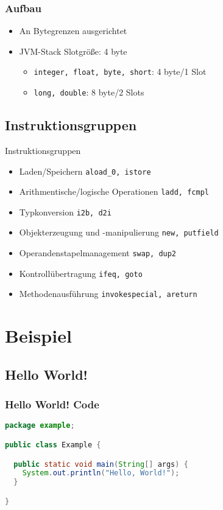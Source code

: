\documentclass[10pt]{beamer}
\begin{document}

\begin{frame}[fragile]
\frametitle{Aufbau}
\begin{itemize}
\item An Bytegrenzen ausgerichtet
\item JVM-Stack Slotgröße: 4 byte
\begin{itemize}
\item {\tt integer, float, byte, short}: 4 byte/1 Slot
\item {\tt long, double}: 8 byte/2 Slots
\end{itemize}
\end{itemize}
\end{frame}


\subsection{Instruktionsgruppen}
\begin{frame}{Instruktionsgruppen}
\begin{itemize}
\item Laden/Speichern \hfill {\tt aload\_0, istore}\;\;\;\pause
\item Arithmentische/logische Operationen \hfill {\tt ladd, fcmpl}\;\;\;\pause
\item Typkonversion \hfill {\tt i2b, d2i}\;\;\;\pause
\item Objekterzeugung und -manipulierung \hfill {\tt new, putfield}\;\;\;\pause
\item Operandenstapelmanagement \hfill {\tt swap, dup2}\;\;\;\pause
\item Kontrollübertragung \hfill {\tt ifeq, goto}\;\;\;\pause
\item Methodenausführung \hfill {\tt invokespecial, areturn}\;\;\;
\end{itemize}
\end{frame}


\section{Beispiel}
\subsection{Hello World!}
\begin{frame}[fragile]
\frametitle{Hello World! Code}
\begin{lstlisting}[language=Java]
package example;

public class Example {

  public static void main(String[] args) {
    System.out.println("Hello, World!");
  }

}
\end{lstlisting}
\end{frame}
\end{document}
